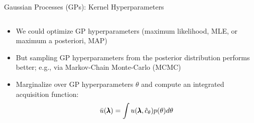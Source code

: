 

\begin{frame}[c]{Gaussian Processes (GPs): Kernel Hyperparameters}

\begin{columns}[T] %
\begin{column}{.6\textwidth}
\begin{itemize}
    \item We could optimize GP hyperparameters (maximum likelihood, MLE, or maximum a posteriori, MAP)


    \item<+-> But \alert{sampling} GP  hyperparameters from the posterior distribution performs better; e.g., via \alert{Markov-Chain Monte-Carlo (MCMC)}


    \item<+-> \alert{Marginalize} over GP hyperparameters $\theta$ and compute an \alert{integrated acquisition function}:
        \begin{equation*}
        \begin{aligned}
            \Bar{u}(\pmb{\lambda}) = \int u (\pmb{\lambda}, \hat{c}_\theta)p(\theta)d\theta
        \end{aligned}
        \end{equation*}


\end{itemize}
\end{column}
\end{columns}
\end{frame}
